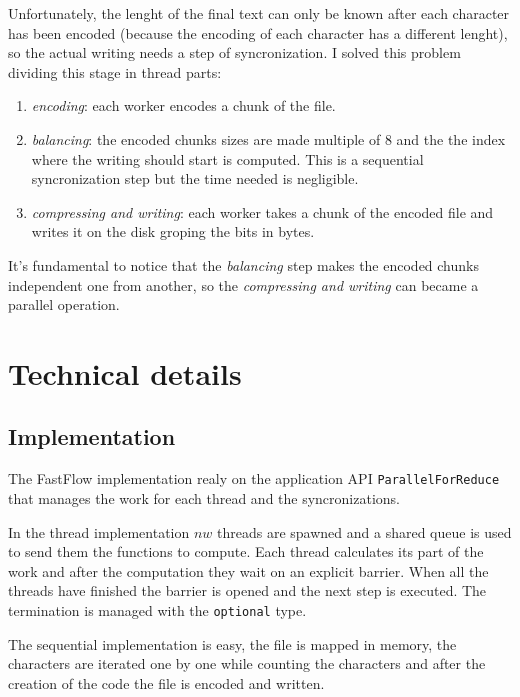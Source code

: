 \documentclass[12pt, letterpaper]{article}
\begin{document}
Unfortunately, the lenght of the final text can only be known after each character has been encoded (because the encoding of each character
has a different lenght), so the actual writing needs a step of syncronization. I solved this problem dividing this stage in thread parts:
\begin{enumerate}
    \item \textit{encoding}: each worker encodes a chunk of the file.
    \item \textit{balancing}: the encoded chunks sizes are made multiple of 8 and the the index where the writing should start is computed. This is a sequential syncronization step but the time needed is negligible.
    \item \textit{compressing and writing}: each worker takes a chunk of the encoded file and writes it on the disk groping the bits in bytes.
\end{enumerate}
It's fundamental to notice that the \textit{balancing} step makes the encoded chunks independent one from another, so the \textit{compressing and writing} can became a parallel operation.


\section{Technical details}

\subsection{Implementation}

The FastFlow implementation realy on the application API \texttt{ParallelForReduce} that manages the work for each thread and the syncronizations.

In the thread implementation $nw$ threads are spawned and a shared queue is used to send them the functions to compute. Each thread calculates its part of the work and after the computation they wait on an explicit barrier. When all the threads have finished the barrier is opened and the next step is executed. The termination is managed with the \texttt{optional} type.

The sequential implementation is easy, the file is mapped in memory, the characters are iterated one by one while counting the characters and after the creation of the code the file is encoded and written.
\end{document}
